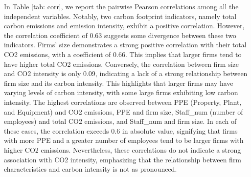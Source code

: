 \documentclass[12pt]{article}
\begin{document}
In Table \ref{tab: corr}, we report the pairwise Pearson correlations among all the independent variables. Notably, two carbon footprint indicators, namely total carbon emissions and emission intensity, exhibit a positive correlation. However, the correlation coefficient of 0.63 suggests some divergence between these two indicators. Firms' size demonstrates a strong positive correlation with their total CO2 emissions, with a coefficient of 0.66. This implies that larger firms tend to have higher total CO2 emissions. Conversely, the correlation between firm size and CO2 intensity is only 0.09, indicating a lack of a strong relationship between firm size and its carbon intensity. This highlights that larger firms may have varying levels of carbon intensity, with some large firms exhibiting low carbon intensity. The highest correlations are observed between PPE (Property, Plant, and Equipment) and CO2 emissions, PPE and firm size, Staff\_num (number of employees) and total CO2 emissions, and Staff\_num and firm size. In each of these cases, the correlation exceeds 0.6 in absolute value, signifying that firms with more PPE and a greater number of employees tend to be larger firms with higher CO2 emissions. Nevertheless, these correlations do not indicate a strong association with CO2 intensity, emphasizing that the relationship between firm characteristics and carbon intensity is not as pronounced.
\end{document}
